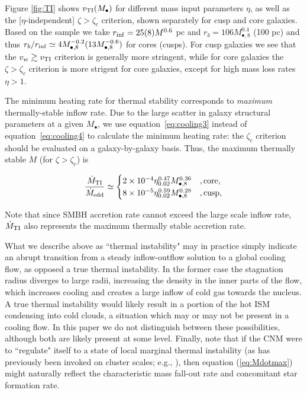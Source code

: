 \documentclass[usenatbib,fleqn]{mn2e}
\newcommand{\Mdot}{\dot{M}}
\newcommand{\rb}{r_b}
\newcommand{\Mbh}[1][]{M_{\bullet#1}}
\newcommand{\Mbheight}{M_{\bullet,8}}
\newcommand{\rinf}{r_{\rm inf}}
\begin{document}
Figure \ref{fig:TI} shows $v_{\rm TI}(M_{\bullet})$ for different mass
input parameters $\eta$, as well as the [$\eta$-independent] $\zeta >
\zeta_c$ criterion, shown separately for cusp and core galaxies.
Based on the \citet{LauerFaber+:2007a} sample we take $\rinf = 25(8)M
^{0.6}$ pc and $\rb = 106 \Mbheight^{0.4}$ (100 pc) and thus
$\rb/\rinf\simeq 4 \Mbheight^{-0.2} (13 \Mbheight^{-0.6})$ for cores
(cusps).  For cusp galaxies we see that the $v_w \gtrsim v_{\rm TI}$
criterion is generally more stringent, while for core galaxies the
$\zeta > \zeta_c$ criterion is more strigent for core galaxies, except
for high mass loss rates $\eta > 1$.

The minimum heating rate for thermal stability corresponds to {\it
  maximum} thermally-stable inflow rate. Due to the large scatter
in galaxy structural parameters at a given $\Mbh$, we use
equation~\eqref{eq:cooling3} instead of equation~\eqref{eq:cooling4}
to calculate the minimum heating rate: the $\zeta_c$ criterion should
be evaluated on a galaxy-by-galaxy basis. Thus, the maximum thermally
stable $\Mdot$ (for $\zeta>\zeta_c$) is

\begin{align}
  \frac{\dot{M}_{\rm TI}}{\dot{M}_{\rm edd}} \simeq \begin{cases}
    2\times 10^{-4}\eta_{0.02}^{0.47}M_{\bullet,8}^{0.36} &, \text{core}, \\
    8\times 10^{-5} \eta_{0.02}^{0.59} M_{\bullet,8}^{0.28}    &, \text{cusp},\\
  \end{cases}
  \label{eq:Mdotmax}
\end{align}

Note that since SMBH accretion rate cannot exceed the large scale
inflow rate, $\dot{M}_{\rm TI}$ also represents the maximum thermally
stable accretion rate.

What we describe above as ``thermal instability" may in practice
simply indicate an abrupt transition from a steady inflow-outflow
solution to a global cooling flow, as opposed a true thermal
instability.  In the former case the stagnation radius diverges to
large radii, increasing the density in the inner parts of the flow,
which increases cooling and creates a large inflow of cold gas towards
the nucleus.  A true thermal instability would likely result in a
portion of the hot ISM condensing into cold clouds, a situation which
may or may not be present in a cooling flow.  In this paper we do not
distinguish between these possibilities, although both are likely
present at some level.  Finally, note that if the CNM were to
``regulate" itself to a state of local marginal thermal instability
(as has previously been invoked on cluster scales; e.g.,
\citealt{Voit+15}), then equation (\ref{eq:Mdotmax}) might naturally
reflect the characteristic mass fall-out rate and concomitant star
formation rate.
\end{document}
